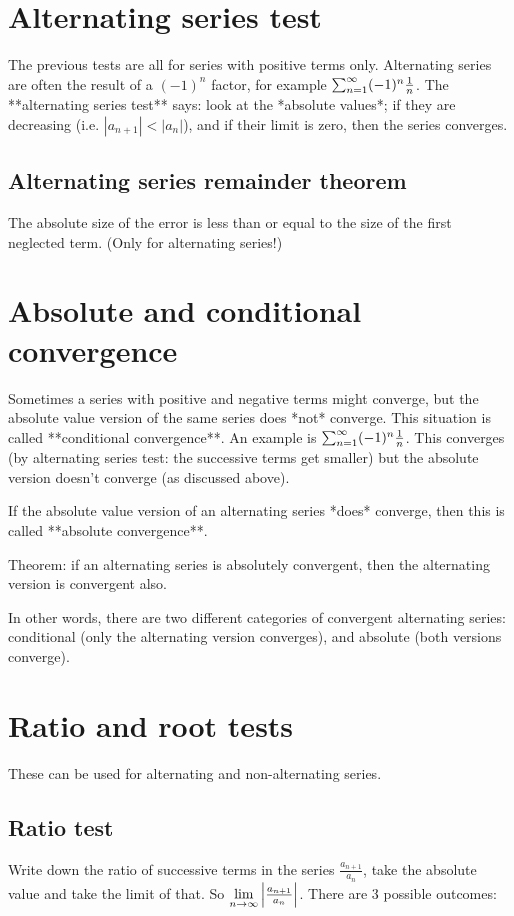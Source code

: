 \section{Alternating series test}
The previous tests are all for series with positive terms only. Alternating series are often the result of a $(-1)^n$ factor, for example $\sum_{n=1}^{\infty} (-1)^n \frac{1}{n}$. The **alternating series test** says: look at the *absolute values*; if they are decreasing (i.e. $|a_{n+1}| < |a_n|$), and if their limit is zero, then the series converges.


\subsection{Alternating series remainder theorem}
The absolute size of the error is less than or equal to the size of the first neglected term. (Only for alternating series!)


\section{Absolute and conditional convergence}

Sometimes a series with positive and negative terms might converge, but the absolute value version of the same series does *not* converge. This situation is called **conditional convergence**. An example is $\sum_{n=1}^{\infty} (-1)^n \frac{1}{n}$. This converges (by alternating series test: the successive terms get smaller) but the absolute version doesn't converge (as discussed above).

If the absolute value version of an alternating series *does* converge, then this is called **absolute convergence**.

Theorem: if an alternating series is absolutely convergent, then the alternating version is convergent also.

In other words, there are two different categories of convergent alternating series: conditional (only the alternating version converges), and absolute (both versions converge).

\section{Ratio and root tests}

These can be used for alternating and non-alternating series.

\subsection{Ratio test}
Write down the ratio of successive terms in the series $\frac{a_{n+1}}{a_n}$, take the absolute value and take the limit of that. So $\lim\limits_{n \to \infty} \Big|\frac{a_{n+1}}{a_n}\Big|$. There are 3 possible outcomes:


